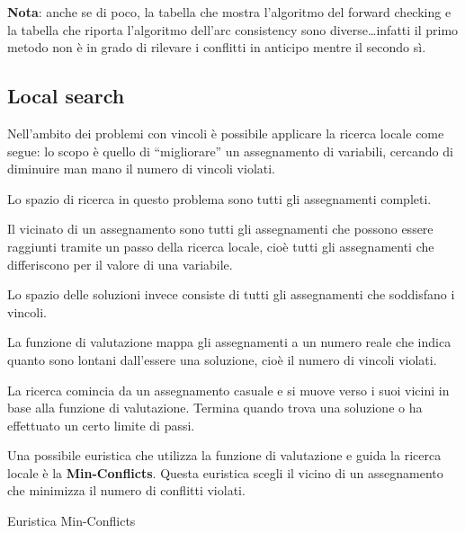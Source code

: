 \textbf{Nota}: anche se di poco, la tabella che mostra l'algoritmo del forward
checking e la tabella che riporta l'algoritmo dell'arc consistency sono
diverse\dots infatti il primo metodo non è in grado di rilevare i conflitti
in anticipo mentre il secondo sì.

\subsection{Local search}

Nell'ambito dei problemi con vincoli è possibile applicare la ricerca
locale come segue: lo scopo è quello di ``migliorare'' un assegnamento
di variabili, cercando di diminuire man mano il numero di vincoli violati.

Lo spazio di ricerca in questo problema sono tutti gli assegnamenti completi.

Il vicinato di un assegnamento sono tutti gli assegnamenti che possono essere
raggiunti tramite un passo della ricerca locale, cioè tutti gli assegnamenti
che differiscono per il valore di una variabile.

Lo spazio delle soluzioni invece consiste di tutti gli assegnamenti che
soddisfano i vincoli.

La funzione di valutazione mappa gli assegnamenti a un numero reale che indica
quanto sono lontani dall'essere una soluzione, cioè il numero di vincoli
violati.

La ricerca comincia da un assegnamento casuale e si muove verso i suoi vicini
in base alla funzione di valutazione. Termina quando trova una soluzione o
ha effettuato un certo limite di passi.

Una possibile euristica che utilizza la funzione di valutazione e guida la
ricerca locale è la \textbf{Min-Conflicts}. Questa euristica scegli il vicino
di un assegnamento che minimizza il numero di conflitti violati.

\begin{algorithm}
    \caption{Euristica Min-Conflicts}
    \label{alg:minconflicts}
    \begin{algorithmic}[1]
              \EndIf
            \EndFor
        \EndProcedure
    \end{algorithmic}
\end{algorithm}


